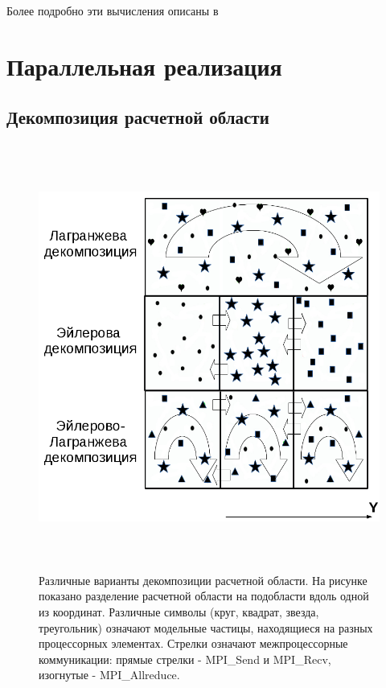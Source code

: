 Более подробно эти вычисления описаны в \cite{VychMetPlasma,MatMod,LotovPoP}


\section{ Параллельная реализация} 


\subsection{Декомпозиция расчетной области}

\begin{figure}[ht]
	\begin{center}
		\includegraphics[height=14cm,keepaspectratio]{images/decomp_all_BW_1.png}
	\end{center}
	\caption{Различные варианты декомпозиции расчетной области. На рисунке показано разделение расчетной области на подобласти вдоль одной из координат. Различные символы (круг, квадрат, звезда, треугольник) означают модельные частицы, находящиеся на разных процессорных  элементах. Стрелки означают межпроцессорные коммуникации: прямые стрелки - MPI\_Send и MPI\_Recv, изогнутые  - MPI\_Allreduce.}
	\label{decomp_all_bw}
\end{figure}

